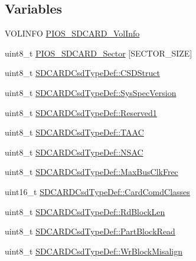 \subsection*{\-Variables}
\begin{DoxyCompactItemize}
\item 
\-V\-O\-L\-I\-N\-F\-O \hyperlink{group___p_i_o_s___s_d_c_a_r_d_gaeb82765ef4d7741f373422b30dba4f32}{\-P\-I\-O\-S\-\_\-\-S\-D\-C\-A\-R\-D\-\_\-\-Vol\-Info}
\item 
uint8\-\_\-t \hyperlink{group___p_i_o_s___s_d_c_a_r_d_ga51dd7d1ab7b2ae3878345834e20546a6}{\-P\-I\-O\-S\-\_\-\-S\-D\-C\-A\-R\-D\-\_\-\-Sector} \mbox{[}\-S\-E\-C\-T\-O\-R\-\_\-\-S\-I\-Z\-E\mbox{]}
\item 
uint8\-\_\-t \hyperlink{group___p_i_o_s___s_d_c_a_r_d_ga49354de313b96595043a78940055d651}{\-S\-D\-C\-A\-R\-D\-Csd\-Type\-Def\-::\-C\-S\-D\-Struct}
\item 
uint8\-\_\-t \hyperlink{group___p_i_o_s___s_d_c_a_r_d_ga68ba16a5f115dc00b88d70d6912a1c45}{\-S\-D\-C\-A\-R\-D\-Csd\-Type\-Def\-::\-Sys\-Spec\-Version}
\item 
uint8\-\_\-t \hyperlink{group___p_i_o_s___s_d_c_a_r_d_ga8d15c8c3b9e293b1b62efea47010180d}{\-S\-D\-C\-A\-R\-D\-Csd\-Type\-Def\-::\-Reserved1}
\item 
uint8\-\_\-t \hyperlink{group___p_i_o_s___s_d_c_a_r_d_gaec29af38b2fc16f147533e11c61e2787}{\-S\-D\-C\-A\-R\-D\-Csd\-Type\-Def\-::\-T\-A\-A\-C}
\item 
uint8\-\_\-t \hyperlink{group___p_i_o_s___s_d_c_a_r_d_ga8573c74ea99da2cfb8f4848fa4350491}{\-S\-D\-C\-A\-R\-D\-Csd\-Type\-Def\-::\-N\-S\-A\-C}
\item 
uint8\-\_\-t \hyperlink{group___p_i_o_s___s_d_c_a_r_d_ga9413a0371dfa0c4bf305c922b10392f1}{\-S\-D\-C\-A\-R\-D\-Csd\-Type\-Def\-::\-Max\-Bus\-Clk\-Frec}
\item 
uint16\-\_\-t \hyperlink{group___p_i_o_s___s_d_c_a_r_d_ga6684006d87c1e8fda9008685fd83698b}{\-S\-D\-C\-A\-R\-D\-Csd\-Type\-Def\-::\-Card\-Comd\-Classes}
\item 
uint8\-\_\-t \hyperlink{group___p_i_o_s___s_d_c_a_r_d_gab4a98c4b27e0e4cbb4ace4d6ff93c056}{\-S\-D\-C\-A\-R\-D\-Csd\-Type\-Def\-::\-Rd\-Block\-Len}
\item 
uint8\-\_\-t \hyperlink{group___p_i_o_s___s_d_c_a_r_d_gab165bf6b064166e0bf54f2a6c7d85a9a}{\-S\-D\-C\-A\-R\-D\-Csd\-Type\-Def\-::\-Part\-Block\-Read}
\item 
uint8\-\_\-t \hyperlink{group___p_i_o_s___s_d_c_a_r_d_gac79fcdd1037496c353ac1570fb9a58a5}{\-S\-D\-C\-A\-R\-D\-Csd\-Type\-Def\-::\-Wr\-Block\-Misalign}

\end{DoxyCompactItemize}
